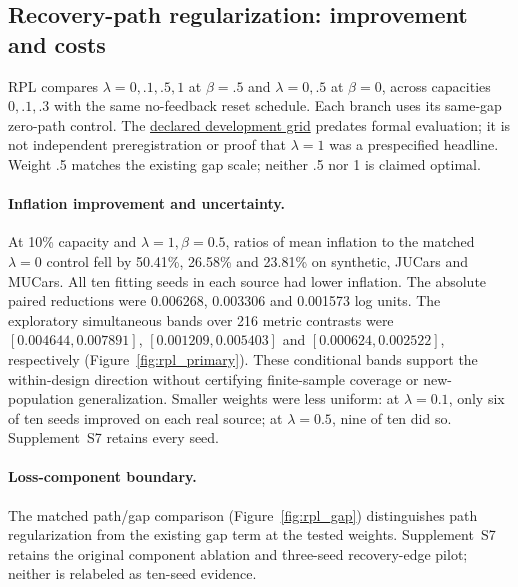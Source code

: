 \documentclass[11pt]{article}
\begin{document}
\subsection{Recovery-path regularization: improvement and costs}\label{sec:rpl_results}
RPL compares $\lambda=0,.1,.5,1$ at $\beta=.5$ and
$\lambda=0,.5$ at $\beta=0$, across capacities $0,.1,.3$ with the same
no-feedback reset schedule. Each branch uses its same-gap zero-path control.
The \href{https://github.com/T0Q0R/secondhand-valuation-research/commit/6643cbe3266f2c1548d987c2bb53e366e19ad3ef}{declared development grid}
predates formal evaluation; it is not independent preregistration or proof
that $\lambda=1$ was a prespecified headline. Weight .5 matches the existing
gap scale; neither .5 nor 1 is claimed optimal.

\paragraph{Inflation improvement and uncertainty.}
At 10\% capacity and $\lambda=1,\beta=0.5$, ratios of mean inflation to the
matched $\lambda=0$ control fell by 50.41\%, 26.58\% and 23.81\% on synthetic,
JUCars and MUCars. All ten fitting seeds in each source had lower inflation.
The absolute paired reductions were 0.006268, 0.003306 and 0.001573 log units.
The exploratory simultaneous bands over 216 metric contrasts were
$[0.004644,0.007891]$, $[0.001209,0.005403]$ and
$[0.000624,0.002522]$, respectively (Figure~\ref{fig:rpl_primary}). These
conditional bands support the within-design direction without certifying
finite-sample coverage or new-population generalization. Smaller weights were
less uniform: at $\lambda=0.1$, only six of ten seeds improved on each real
source; at $\lambda=0.5$, nine of ten did so. Supplement~S7
retains every seed.

\paragraph{Loss-component boundary.}
The matched path/gap comparison (Figure~\ref{fig:rpl_gap}) distinguishes
path regularization from the existing gap term at the tested weights.
Supplement~S7 retains the original component ablation and
three-seed recovery-edge pilot; neither is relabeled as ten-seed evidence.
\end{document}
